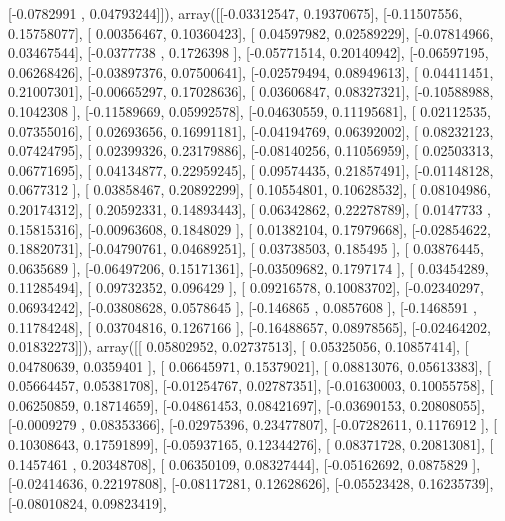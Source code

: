 \documentclass{article}
\begin{document}
       [-0.0782991 ,  0.04793244]]), array([[-0.03312547,  0.19370675],
       [-0.11507556,  0.15758077],
       [ 0.00356467,  0.10360423],
       [ 0.04597982,  0.02589229],
       [-0.07814966,  0.03467544],
       [-0.0377738 ,  0.1726398 ],
       [-0.05771514,  0.20140942],
       [-0.06597195,  0.06268426],
       [-0.03897376,  0.07500641],
       [-0.02579494,  0.08949613],
       [ 0.04411451,  0.21007301],
       [-0.00665297,  0.17028636],
       [ 0.03606847,  0.08327321],
       [-0.10588988,  0.1042308 ],
       [-0.11589669,  0.05992578],
       [-0.04630559,  0.11195681],
       [ 0.02112535,  0.07355016],
       [ 0.02693656,  0.16991181],
       [-0.04194769,  0.06392002],
       [ 0.08232123,  0.07424795],
       [ 0.02399326,  0.23179886],
       [-0.08140256,  0.11056959],
       [ 0.02503313,  0.06771695],
       [ 0.04134877,  0.22959245],
       [ 0.09574435,  0.21857491],
       [-0.01148128,  0.0677312 ],
       [ 0.03858467,  0.20892299],
       [ 0.10554801,  0.10628532],
       [ 0.08104986,  0.20174312],
       [ 0.20592331,  0.14893443],
       [ 0.06342862,  0.22278789],
       [ 0.0147733 ,  0.15815316],
       [-0.00963608,  0.1848029 ],
       [ 0.01382104,  0.17979668],
       [-0.02854622,  0.18820731],
       [-0.04790761,  0.04689251],
       [ 0.03738503,  0.185495  ],
       [ 0.03876445,  0.0635689 ],
       [-0.06497206,  0.15171361],
       [-0.03509682,  0.1797174 ],
       [ 0.03454289,  0.11285494],
       [ 0.09732352,  0.096429  ],
       [ 0.09216578,  0.10083702],
       [-0.02340297,  0.06934242],
       [-0.03808628,  0.0578645 ],
       [-0.146865  ,  0.0857608 ],
       [-0.1468591 ,  0.11784248],
       [ 0.03704816,  0.1267166 ],
       [-0.16488657,  0.08978565],
       [-0.02464202,  0.01832273]]), array([[ 0.05802952,  0.02737513],
       [ 0.05325056,  0.10857414],
       [ 0.04780639,  0.0359401 ],
       [ 0.06645971,  0.15379021],
       [ 0.08813076,  0.05613383],
       [ 0.05664457,  0.05381708],
       [-0.01254767,  0.02787351],
       [-0.01630003,  0.10055758],
       [ 0.06250859,  0.18714659],
       [-0.04861453,  0.08421697],
       [-0.03690153,  0.20808055],
       [-0.0009279 ,  0.08353366],
       [-0.02975396,  0.23477807],
       [-0.07282611,  0.1176912 ],
       [ 0.10308643,  0.17591899],
       [-0.05937165,  0.12344276],
       [ 0.08371728,  0.20813081],
       [ 0.1457461 ,  0.20348708],
       [ 0.06350109,  0.08327444],
       [-0.05162692,  0.0875829 ],
       [-0.02414636,  0.22197808],
       [-0.08117281,  0.12628626],
       [-0.05523428,  0.16235739],
       [-0.08010824,  0.09823419],
\end{document}
